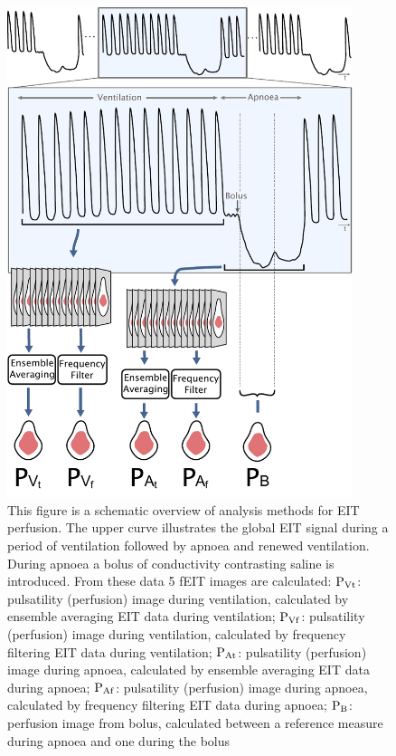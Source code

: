 \begin{figure}
\centering
\includegraphics[width=0.9\textwidth]{chapter3-perfusion_analysis/imgs/fig-methodsOverview.pdf}
\caption[Overview of the EIT analysis methods]{
This figure is a schematic overview of analysis methods for EIT perfusion. 
The upper
curve illustrates the global EIT signal during a period of ventilation
followed by apnoea and renewed ventilation. During apnoea a bolus
of conductivity contrasting saline is introduced. From these data
5 fEIT images are calculated:
${\rm P_{Vt}}$: pulsatility (perfusion) image during ventilation, calculated
by ensemble averaging EIT data during ventilation;
${\rm P_{Vf}}$: pulsatility (perfusion) image during ventilation, calculated
by frequency filtering EIT data during ventilation;
${\rm P_{At}}$: pulsatility (perfusion) image during apnoea, calculated
by ensemble averaging EIT data during apnoea;
${\rm P_{Af}}$: pulsatility (perfusion) image during apnoea, calculated
by frequency filtering EIT data during apnoea;
${\rm P_{B}}$: perfusion image from bolus, calculated between a 
reference measure during apnoea and one during the bolus}
\label{fig:methods}%
\end{figure}

